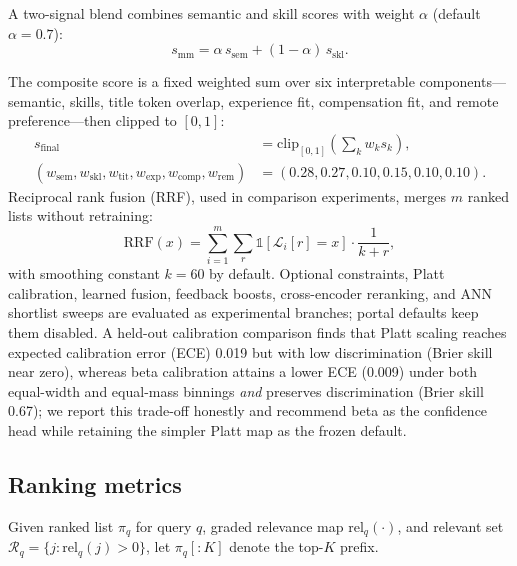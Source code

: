 A two-signal blend combines semantic and skill scores with weight $\alpha$ (default $\alpha{=}0.7$):
\begin{equation}
  s_{\mathrm{mm}} = \alpha\, s_{\mathrm{sem}} + (1-\alpha)\, s_{\mathrm{skl}}.
  \label{eq:multimodal}
\end{equation}

The composite score is a fixed weighted sum over six interpretable components---semantic, skills, title token overlap, experience fit, compensation fit, and remote preference---then clipped to $[0,1]$:
\begin{equation}
  \begin{aligned}
  s_{\mathrm{final}} &=
    \mathrm{clip}_{[0,1]}\!\left(\sum_{k} w_k s_k\right),\\
  (w_{\mathrm{sem}}, w_{\mathrm{skl}}, w_{\mathrm{tit}}, w_{\mathrm{exp}},
   w_{\mathrm{comp}}, w_{\mathrm{rem}})
    &= (0.28, 0.27, 0.10, 0.15, 0.10, 0.10).
  \end{aligned}
  \label{eq:composite}
\end{equation}
Reciprocal rank fusion (RRF), used in comparison experiments, merges $m$ ranked lists without retraining:
\begin{equation}
  \mathrm{RRF}(x) = \sum_{i=1}^{m} \sum_{r} \mathbb{1}[\mathcal{L}_i[r] = x] \cdot \frac{1}{k + r},
  \label{eq:rrf}
\end{equation}
with smoothing constant $k{=}60$ by default.
Optional constraints, Platt calibration, learned fusion, feedback boosts, cross-encoder reranking, and ANN shortlist sweeps are evaluated as experimental branches; portal defaults keep them disabled.
A held-out calibration comparison finds that Platt scaling reaches expected calibration error (ECE) 0.019 but with low discrimination (Brier skill near zero), whereas beta calibration attains a lower ECE (0.009) under both equal-width and equal-mass binnings \emph{and} preserves discrimination (Brier skill 0.67); we report this trade-off honestly and recommend beta as the confidence head while retaining the simpler Platt map as the frozen default.

\subsection{Ranking metrics}\label{sec:5-ranking}

Given ranked list $\pi_q$ for query $q$, graded relevance map $\mathrm{rel}_q(\cdot)$, and relevant set $\mathcal{R}_q = \{ j : \mathrm{rel}_q(j) > 0 \}$, let $\pi_q[:K]$ denote the top-$K$ prefix.

